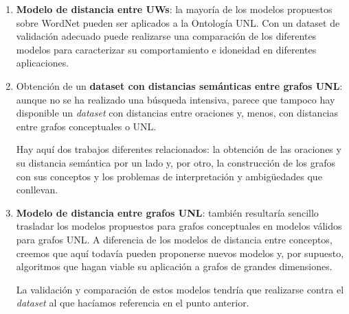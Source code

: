 \documentclass[a4paper,12pt,spanish]{book}
\begin{document}
\begin{enumerate}
{Sin embargo, según ha podido saber el autor de este trabajo a través de correos
electrónicos intercambiados con la profesora R. Mihalcea, la actualización de este
corpus no está garantizada. A este hecho hay que añadir que no se ha encontrado ningún
otro corpus etiquetado para WordNet.
} que es un subconjunto del Brown Corpus \footnote{
El Brown Corpus se crea en los 1960s por Henry Kucera y
W. Nelson Francis (Brown University, Providence, Rhode Island) tomando 500 muestras de
artículos de periódico escritos por hablantes nativos de inglés americano. Hay que hacer
notar la triple limitación: medio (escrito), local (USA), temporal (1961) y
cuantitativo (un millón de palabras); no podemos darle una validez general.
} anotado con los conceptos de
WordNet 1.6 y mapeado automáticamente a las versiones posteriores de WordNet.

\item {} 
\textbf{Modelo de distancia entre UWs}: la mayoría de los modelos propuestos sobre WordNet
pueden ser aplicados a la Ontología UNL. Con un dataset de validación adecuado puede
realizarse una comparación de los diferentes modelos para caracterizar su comportamiento
e idoneidad en diferentes aplicaciones.

\item {} 
Obtención de un \textbf{dataset con distancias semánticas entre grafos UNL}: aunque no se
ha realizado una búsqueda intensiva, parece que tampoco hay disponible un \emph{dataset}
con distancias entre oraciones y, menos, con distancias entre grafos conceptuales o
UNL.

Hay aquí dos trabajos diferentes relacionados: la obtención de las oraciones y
su distancia semántica por un lado y, por otro, la construcción de los grafos con
sus conceptos y los problemas de interpretación y ambigüedades que conllevan.

\item {} 
\textbf{Modelo de distancia entre grafos UNL}: también resultaría sencillo trasladar los
modelos propuestos para grafos conceptuales en modelos válidos para grafos UNL. A
diferencia de los modelos de distancia entre conceptos, creemos que aquí todavía
pueden proponerse nuevos modelos y, por supuesto, algoritmos que hagan viable su
aplicación a grafos de grandes dimensiones.

La validación y comparación de estos modelos tendría que realizarse contra el \emph{dataset}
al que hacíamos referencia en el punto anterior.

\end{enumerate}
\end{document}
